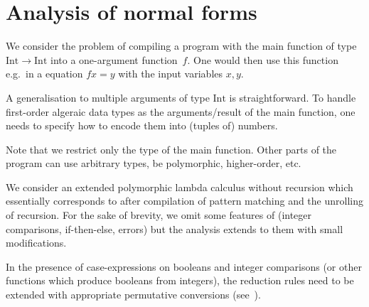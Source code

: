 \documentclass[
    9pt,            %
    techreport,        %
    affiltop,       %
]{art}
\begin{document}
\nocite{*}


\newpage
\appendix

\renewcommand{\thesection}{\Alph{section}}

\section{Analysis of normal forms}\label{sec_normal_forms}

We consider the problem of compiling a \Juvix{} program with the main
function of type $\mathrm{Int} \to \mathrm{Int}$ into a one-argument
\VampIR{} function~$f$. One would then use this function e.g.~in a \VampIR{}
equation $f x = y$ with the input variables $x,y$.

A generalisation to multiple arguments of type $\mathrm{Int}$ is
straightforward. To handle first-order algeraic data types as the
arguments/result of the main function, one needs to specify how to
encode them into (tuples of) numbers.

Note that we restrict only the type of the main function. Other parts
of the program can use arbitrary types, be polymorphic, higher-order,
etc.

We consider an extended polymorphic lambda calculus without recursion
which essentially corresponds to \JuvixCore{} after compilation of
pattern matching and the unrolling of recursion. For the sake of
brevity, we omit some features of \JuvixCore{} (integer comparisons, if-then-else, errors) but
the analysis extends to them with small modifications.

In the presence of case-expressions on booleans and integer comparisons (or other functions which produce booleans from integers), the reduction rules need to be extended with appropriate permutative conversions (see~\cite[Chapter~6]{basic-proof-theory}).

\medskip
\end{document}
